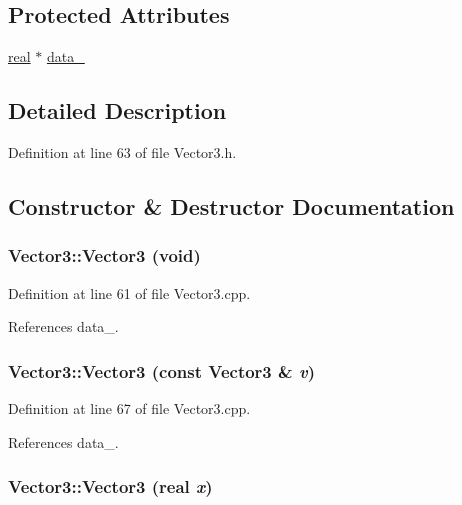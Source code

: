 \subsection*{Protected Attributes}
\begin{DoxyCompactItemize}
\item 
\hyperlink{Global_8h_a031f8951175b43076c2084a6c2173410}{real} $\ast$ \hyperlink{classVector3_acb3d1e96d07b66586a7f78a79d9a8996}{data\_\-}
\end{DoxyCompactItemize}


\subsection{Detailed Description}


Definition at line 63 of file Vector3.h.



\subsection{Constructor \& Destructor Documentation}
\subsubsection[{Vector3}]{\setlength{\rightskip}{0pt plus 5cm}Vector3::Vector3 (void)}\label{classVector3_a020d62af9911f9f174a3f2adbace2270}


Definition at line 61 of file Vector3.cpp.



References data\_\-.

\subsubsection[{Vector3}]{\setlength{\rightskip}{0pt plus 5cm}Vector3::Vector3 (const {\bf Vector3} \& {\em v})}\label{classVector3_a22b934b48fd08329bde8985a9ba21951}


Definition at line 67 of file Vector3.cpp.



References data\_\-.

\subsubsection[{Vector3}]{\setlength{\rightskip}{0pt plus 5cm}Vector3::Vector3 ({\bf real} {\em x})}\label{classVector3_aa441f00157da1718c8d766223d82bc90}


